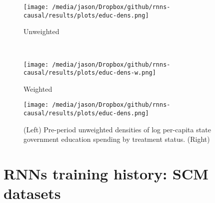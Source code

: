 \documentclass[12pt]{article}
\begin{document}
\begin{figure*}[htbp]
	\centering
	\begin{subfigure}[t]{0.45\textwidth}
		\centering
		\texttt{[image: /media/jason/Dropbox/github/rnns-causal/results/plots/educ-dens.png]}
		\caption{Unweighted \label{educ-dense}} 
	\end{subfigure}
	~ 
	\begin{subfigure}[t]{0.45\textwidth}
		\centering
		\texttt{[image: /media/jason/Dropbox/github/rnns-causal/results/plots/educ-dens-w.png]}
		\caption{Weighted\label{educ-dense-w}}
	\end{subfigure}
	\caption{Pre-period densities of log per-capita state government education spending by treatment status. Density in \ref{educ-dense-w} weighted by propensity score.} 
\end{figure*}

\begin{figure}[htbp]
	\begin{center}
		\texttt{[image: /media/jason/Dropbox/github/rnns-causal/results/plots/educ-dens.png]} \\
		\caption{(Left) Pre-period unweighted densities of log per-capita state government education spending by treatment status. (Right)  \label{educ-dense}} 
	\end{center}
\end{figure}

\section{RNNs training history: SCM datasets}
\end{document}
